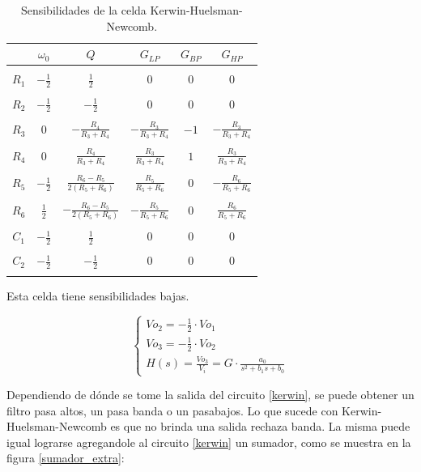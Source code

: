 \begin{table}[h!]
	\centering
	\begin{tabular}{c c c c c c}
		  & $\omega_0$ & $Q$ &$G_{LP}$ & $G_{BP}$& $G_{HP}$\\
		\hline \\
	$R_1$ & $-\frac{1}{2}$& $\frac{1}{2}$ & $0$& $0$&$0$\\ \\
	$R_2$ & $-\frac{1}{2}$& $-\frac{1}{2}$ & $0$& $0$& $0$\\ \\
	$R_3$ & $0$& $-\frac{R_4}{R_3+R_4}$ & $-\frac{R_3}{R_3+R_4}$&$-1$ & $-\frac{R_3}{R_3+R_4}$\\ \\
	$R_4$ & $0$& $\frac{R_4}{R_3+R_4}$& $\frac{R_3}{R_3+R_4}$ &$1$ & $\frac{R_3}{R_3+R_4}$\\ \\
	$R_5$ & $-\frac{1}{2}$&$\frac{R_6-R_5}{2(R_5+R_6)}$ & $\frac{R_5}{R_5+R_6}$&$0$ & $-\frac{R_6}{R_5+R_6}$\\ \\
	$R_6$ & $\frac{1}{2}$& $-\frac{R_6-R_5}{2(R_5+R_6)}$ & $-\frac{R_5}{R_5+R_6}$& $0$&$\frac{R_6}{R_5+R_6}$ \\ \\
	$C_1$ & $-\frac{1}{2}$& $\frac{1}{2}$ & $0$& $0$&$0$ \\ \\
	$C_2$ & $-\frac{1}{2}$& $-\frac{1}{2}$ & $0$ & $0$&$0$\\ \\
		\hline
	\end{tabular}
	\caption{Sensibilidades de la celda Kerwin-Huelsman-Newcomb.}
	\label{sens_k}
\end{table}

Esta celda tiene sensibilidades bajas.

\begin{equation}
\begin{cases}
Vo_2 = -\frac{1}{2} \cdot Vo_1\\
Vo_3 = -\frac{1}{2} \cdot Vo_2\\
H(s) = \frac{Vo_3}{V_i} = G \cdot \frac{a_0}{s^2 + b_1 s + b_0}
\label{int2eq}
\end{cases}
\end{equation}


Dependiendo de d\'onde se tome la salida del circuito \ref{kerwin}, se puede obtener un filtro pasa altos, un pasa banda o un pasabajos. Lo que sucede con Kerwin-Huelsman-Newcomb es que no brinda una salida rechaza banda. La misma puede igual lograrse agregandole al circuito \ref{kerwin} un sumador, como se muestra en la figura \ref{sumador_extra}:

